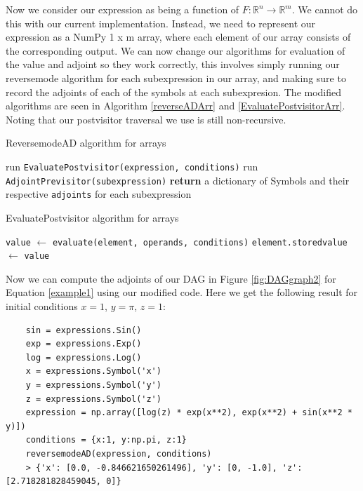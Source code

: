 \documentclass{article}
\begin{document}
Now we consider our expression as being a function of $F: \mathbb{R}^n \longrightarrow \mathbb{R}^m$. We cannot do this with our current implementation. Instead, we need to represent our expression as a NumPy 1 x m array, where each element of our array consists of the corresponding output. We can now change our algorithms for evaluation of the value and adjoint so they work correctly, this involves simply running our reversemode algorithm for each subexpression in our array, and making sure to record the adjoints of each of the symbols at each subexpresion. The modified algorithms are seen in Algorithm \ref{reverseADArr} and \ref{EvaluatePostvisitorArr}. Noting that our postvisitor traversal we use is still non-recursive.

\begin{algorithm}[h]
\caption{ReversemodeAD algorithm for arrays}\label{reverseADArr}
\begin{algorithmic}[1]
\State run \verb|EvaluatePostvisitor(expression, conditions)|
\State run \verb|AdjointPrevisitor(subexpression)|
\EndFor
\State \textbf{return} a dictionary of Symbols and their respective \verb|adjoints| for each subexpression
\EndProcedure
\end{algorithmic}
\end{algorithm}

\begin{algorithm}[h!]
\caption{EvaluatePostvisitor algorithm for arrays}\label{EvaluatePostvisitorArr}
\begin{algorithmic}[1]
\State \verb|value| $\gets$ \verb|evaluate(element, operands, conditions)|
\State \verb|element.storedvalue| $\gets$ \verb|value|
\EndFor
\EndFor
\EndProcedure
\end{algorithmic}
\end{algorithm}

Now we can compute the adjoints of our DAG in Figure \ref{fig:DAGgraph2} for Equation \ref{example1} using our modified code. Here we get the following result for initial conditions $x=1$, $y=\pi$, $z=1$:

\begin{verbatim}
    sin = expressions.Sin()
    exp = expressions.Exp()
    log = expressions.Log()
    x = expressions.Symbol('x')
    y = expressions.Symbol('y')
    z = expressions.Symbol('z')
    expression = np.array([log(z) * exp(x**2), exp(x**2) + sin(x**2 * y)])
    conditions = {x:1, y:np.pi, z:1}
    reversemodeAD(expression, conditions)
    > {'x': [0.0, -0.846621650261496], 'y': [0, -1.0], 'z': [2.718281828459045, 0]}
\end{verbatim}
\end{document}
